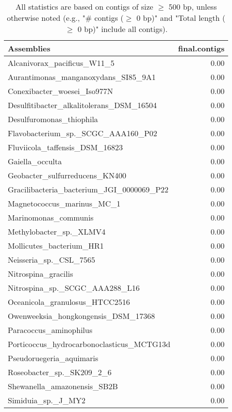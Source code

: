 \documentclass[12pt,a4paper]{article}
\begin{document}
\begin{table}[ht]
\begin{center}
\caption{All statistics are based on contigs of size $\geq$ 500 bp, unless otherwise noted (e.g., "\# contigs ($\geq$ 0 bp)" and "Total length ($\geq$ 0 bp)" include all contigs).}
\begin{tabular}{|l*{1}{|r}|}
\hline
Assemblies & final.contigs \\ \hline
Alcanivorax\_pacificus\_W11\_5 & 0.00 \\ \hline
Aurantimonas\_manganoxydans\_SI85\_9A1 & 0.00 \\ \hline
Conexibacter\_woesei\_Iso977N & 0.00 \\ \hline
Desulfitibacter\_alkalitolerans\_DSM\_16504 & 0.00 \\ \hline
Desulfuromonas\_thiophila & 0.00 \\ \hline
Flavobacterium\_sp.\_SCGC\_AAA160\_P02 & 0.00 \\ \hline
Fluviicola\_taffensis\_DSM\_16823 & 0.00 \\ \hline
Gaiella\_occulta & 0.00 \\ \hline
Geobacter\_sulfurreducens\_KN400 & 0.00 \\ \hline
Gracilibacteria\_bacterium\_JGI\_0000069\_P22 & 0.00 \\ \hline
Magnetococcus\_marinus\_MC\_1 & 0.00 \\ \hline
Marinomonas\_communis & 0.00 \\ \hline
Methylobacter\_sp.\_XLMV4 & 0.00 \\ \hline
Mollicutes\_bacterium\_HR1 & 0.00 \\ \hline
Neisseria\_sp.\_CSL\_7565 & 0.00 \\ \hline
Nitrospina\_gracilis & 0.00 \\ \hline
Nitrospina\_sp.\_SCGC\_AAA288\_L16 & 0.00 \\ \hline
Oceanicola\_granulosus\_HTCC2516 & 0.00 \\ \hline
Owenweeksia\_hongkongensis\_DSM\_17368 & 0.00 \\ \hline
Paracoccus\_aminophilus & 0.00 \\ \hline
Porticoccus\_hydrocarbonoclasticus\_MCTG13d & 0.00 \\ \hline
Pseudoruegeria\_aquimaris & 0.00 \\ \hline
Roseobacter\_sp.\_SK209\_2\_6 & 0.00 \\ \hline
Shewanella\_amazonensis\_SB2B & 0.00 \\ \hline
Simiduia\_sp.\_J\_MY2 & 0.00 \\ \hline

\end{tabular}
\end{center}
\end{table}
\end{document}
